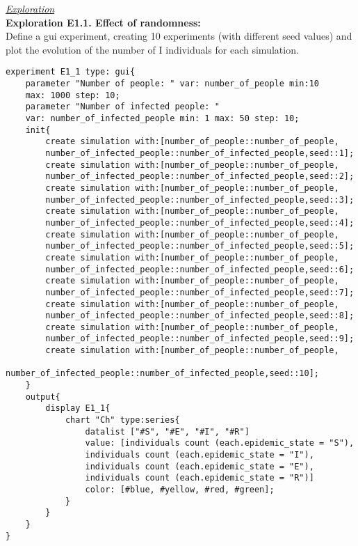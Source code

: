 \documentclass{article}
\begin{document}
\underline{\emph{Exploration}}
\\
\textbf{Exploration E1.1. Effect of randomness:}
\\
Define a gui experiment, creating 10 experiments (with different seed values) and plot the evolution of the number of I individuals for each simulation.
\\
\lstset{style=mystyle2}
\begin{lstlisting}
experiment E1_1 type: gui{
	parameter "Number of people: " var: number_of_people min:10 
	max: 1000 step: 10;
	parameter "Number of infected people: " 
	var: number_of_infected_people min: 1 max: 50 step: 10;
	init{
		create simulation with:[number_of_people::number_of_people,
		number_of_infected_people::number_of_infected_people,seed::1];
		create simulation with:[number_of_people::number_of_people,
		number_of_infected_people::number_of_infected_people,seed::2];
		create simulation with:[number_of_people::number_of_people,
		number_of_infected_people::number_of_infected_people,seed::3];
		create simulation with:[number_of_people::number_of_people,
		number_of_infected_people::number_of_infected_people,seed::4];
		create simulation with:[number_of_people::number_of_people,
		number_of_infected_people::number_of_infected_people,seed::5];
		create simulation with:[number_of_people::number_of_people,
		number_of_infected_people::number_of_infected_people,seed::6];
		create simulation with:[number_of_people::number_of_people,
		number_of_infected_people::number_of_infected_people,seed::7];
		create simulation with:[number_of_people::number_of_people,
		number_of_infected_people::number_of_infected_people,seed::8];
		create simulation with:[number_of_people::number_of_people,
		number_of_infected_people::number_of_infected_people,seed::9];
		create simulation with:[number_of_people::number_of_people,
		number_of_infected_people::number_of_infected_people,seed::10];
	}
	output{
		display E1_1{
			chart "Ch" type:series{
				datalist ["#S", "#E", "#I", "#R"] 
				value: [individuals count (each.epidemic_state = "S"), 		
				individuals count (each.epidemic_state = "I"),			
				individuals count (each.epidemic_state = "E"), 				
				individuals count (each.epidemic_state = "R")] 
				color: [#blue, #yellow, #red, #green]; 			  
			}
		}
	}
}
\end{lstlisting}
\end{document}
